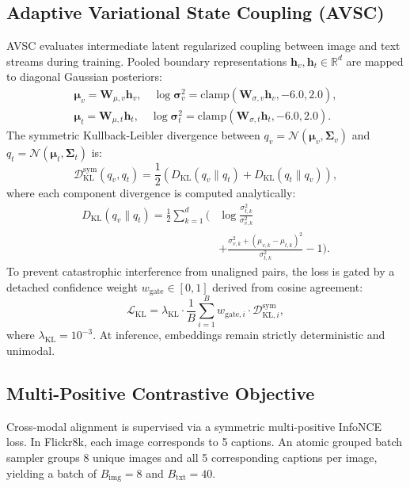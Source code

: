 \documentclass[conference]{IEEEtran}
\begin{document}
\subsection{Adaptive Variational State Coupling (AVSC)}
AVSC evaluates intermediate latent regularized coupling between image and text streams during training. Pooled boundary representations $\mathbf{h}_v, \mathbf{h}_t \in \mathbb{R}^d$ are mapped to diagonal Gaussian posteriors:
\begin{align}
\label{eq:avsc_params_v}
\boldsymbol{\mu}_v = \mathbf{W}_{\mu, v} \mathbf{h}_v, \quad \log \boldsymbol{\sigma}_v^2 = \mathrm{clamp}(\mathbf{W}_{\sigma, v} \mathbf{h}_v, -6.0, 2.0), \\
\label{eq:avsc_params_t}
\boldsymbol{\mu}_t = \mathbf{W}_{\mu, t} \mathbf{h}_t, \quad \log \boldsymbol{\sigma}_t^2 = \mathrm{clamp}(\mathbf{W}_{\sigma, t} \mathbf{h}_t, -6.0, 2.0).
\end{align}
The symmetric Kullback-Leibler divergence between $q_v = \mathcal{N}(\boldsymbol{\mu}_v, \boldsymbol{\Sigma}_v)$ and $q_t = \mathcal{N}(\boldsymbol{\mu}_t, \boldsymbol{\Sigma}_t)$ is:
\begin{equation}
\label{eq:kl_sym}
\mathcal{D}_{\mathrm{KL}}^{\mathrm{sym}}(q_v, q_t) = \frac{1}{2}\left( D_{\mathrm{KL}}(q_v \parallel q_t) + D_{\mathrm{KL}}(q_t \parallel q_v) \right),
\end{equation}
where each component divergence is computed analytically:
\begin{equation}
\label{eq:kl_component}
\begin{aligned}
D_{\mathrm{KL}}(q_v \parallel q_t) = \frac{1}{2} \sum_{k=1}^d \bigg( &\log \frac{\sigma_{t,k}^2}{\sigma_{v,k}^2} \\
&+ \frac{\sigma_{v,k}^2 + (\mu_{v,k} - \mu_{t,k})^2}{\sigma_{t,k}^2} - 1 \bigg).
\end{aligned}
\end{equation}
To prevent catastrophic interference from unaligned pairs, the loss is gated by a detached confidence weight $w_{\mathrm{gate}} \in [0, 1]$ derived from cosine agreement:
\begin{equation}
\label{eq:avsc_loss}
\mathcal{L}_{\mathrm{KL}} = \lambda_{\mathrm{KL}} \cdot \frac{1}{B}\sum_{i=1}^B w_{\mathrm{gate}, i} \cdot \mathcal{D}_{\mathrm{KL}, i}^{\mathrm{sym}},
\end{equation}
where $\lambda_{\mathrm{KL}} = 10^{-3}$. At inference, embeddings remain strictly deterministic and unimodal.

\subsection{Multi-Positive Contrastive Objective}
Cross-modal alignment is supervised via a symmetric multi-positive InfoNCE loss. In Flickr8k, each image corresponds to 5 captions. An atomic grouped batch sampler groups 8 unique images and all 5 corresponding captions per image, yielding a batch of $B_{\mathrm{img}} = 8$ and $B_{\mathrm{txt}} = 40$.
\end{document}
